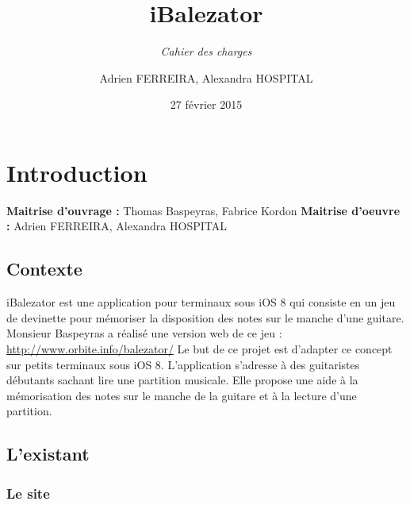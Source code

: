\documentclass{scrreprt}
\begin{document}

\title{iBalezator}
\subtitle{\textit{Cahier des charges}\vspace{-5ex}}
\date{27 février 2015}
\author{Adrien FERREIRA, Alexandra HOSPITAL}
\maketitle
\tableofcontents \newpage


\chapter{Introduction}

\noindent \textbf{Maitrise d’ouvrage :} Thomas Baspeyras, Fabrice Kordon \newline
\noindent \textbf{Maitrise d’oeuvre :} Adrien FERREIRA, Alexandra HOSPITAL\newline

\section{Contexte}


iBalezator est une application pour terminaux sous iOS 8 qui consiste en un jeu de devinette pour mémoriser la disposition des notes sur le manche d’une guitare. Monsieur Baspeyras a réalisé une version web de ce jeu :\newline
\url{http://www.orbite.info/balezator/}\newline
Le but de ce projet est d’adapter ce concept sur petits terminaux sous iOS 8.
L’application s’adresse à des guitaristes débutants sachant lire une partition musicale. Elle propose une aide à la mémorisation des notes sur le manche de la guitare et à la lecture d’une partition.


\section{L’existant}
\subsection{Le site}
\end{document}
